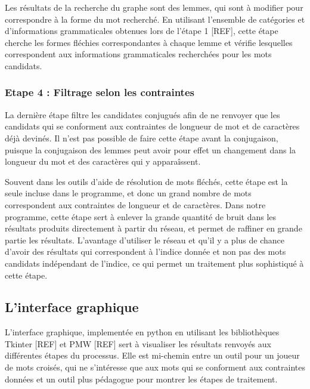 \documentclass[a4paper, 12pt]{article}
\begin{document}
Les résultats de la recherche du graphe sont des lemmes, qui sont à modifier 
pour correspondre à la forme du mot recherché. En utilisant l'ensemble de 
catégories et d'informations grammaticales obtenues lors de l'étape 1 [REF], 
cette étape cherche les formes fléchies correspondantes à chaque lemme et 
vérifie lesquelles correspondent aux informations grammaticales recherchées pour 
les mots candidats.

\subsubsection{Etape 4 : Filtrage selon les contraintes}

La dernière étape filtre les candidates conjugués afin de ne renvoyer que les 
candidats qui se conforment aux contraintes de longueur de mot et de caractères 
déjà devinés. Il n'est pas possible de faire cette étape avant la conjugaison, 
puisque la conjugaison des lemmes peut avoir pour effet un changement dans la 
longueur du mot et des caractères qui y apparaîssent.

Souvent dans les outils d'aide de résolution de mots fléchés, cette étape est 
la seule incluse dans le programme, et donc un grand nombre de mots 
correspondent aux contraintes de longueur et de caractères. Dans notre 
programme, cette étape sert à enlever la grande quantité de bruit dans les 
résultats produits directement à partir du réseau, et permet de raffiner en 
grande partie les résultats. L'avantage d'utiliser le réseau et qu'il y a plus 
de chance d'avoir des résultats qui correspondent à l'indice donnée et non pas 
des mots candidats indépendant de l'indice, ce qui permet un traitement plus 
sophistiqué à cette étape.

\subsection{L'interface graphique}

L'interface graphique, implementée en python en utilisant les bibliothèques 
Tkinter [REF] et PMW [REF] sert à visualiser les résultats renvoyés aux 
différentes étapes du processus. Elle est mi-chemin entre un outil pour un 
joueur de mots croisés, qui ne s'intéresse que aux mots qui se conforment aux 
contraintes données et un outil plus pédagogue pour montrer les étapes de 
traitement.
\end{document}
